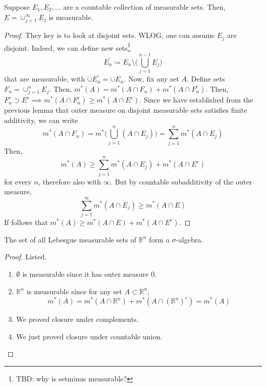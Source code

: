   \begin{theorem}
    Suppose $E_1, E_2, \ldots$ are a countable collection of measurable sets. Then, $E = \cup_{j=1}^\infty E_j$ is measurable. 
  \end{theorem}
  \begin{proof}
    They key is to look at disjoint sets. WLOG, one can assume $E_j$ are disjoint. Indeed, we can define new sets\footnote{TBD: why is setminus measurable?}
    \begin{equation}
      E_n^\prime \coloneqq E_n \setminus \bigg( \bigcup_{j=1}^{n-1} E_j \bigg) 
    \end{equation}
    that are measurable, with $\cup E_n^\prime = \cup E_n$. Now, fix any set $A$. Define sets $F_n = \cup_{j=1}^n E_j$. Then, $m^\ast (A) = m^\ast (A \cap F_n) + m^\ast (A \cap F_n^c)$. Then, $F_n^c \supset E^c \implies m^\ast (A \cap F_n^c) \geq m^\ast (A \cap E^c)$. Since we have established from the previous lemma that outer measure on disjoint measurable sets satisfies finite additivity, we can write
    \begin{equation}
      m^\ast (A \cap F_n) = m^\ast \bigg( \bigcup_{j=1}^n (A \cap E_j) \bigg) = \sum_{j=1}^n m^\ast (A \cap E_j) 
    \end{equation}
    Then, 
    \begin{equation}
      m^\ast (A) \geq \sum_{j=1}^n m^\ast (A \cap E_j) + m^\ast (A \cap E^c) 
    \end{equation}
    for every $n$, therefore also with $\infty$. But by countable subadditivity of the outer measure, 
    \begin{equation}
      \sum_{j=1}^\infty m^\ast (A \cap E_j) \geq m^\ast (A \cap E)
    \end{equation}
    If follows that $m^\ast (A) \geq m^\ast (A \cap E) + m^\ast (A \cap E^c)$. 
  \end{proof}

  \begin{corollary}
    The set of all Lebesgue measurable sets of $\mathbb{R}^n$ form a $\sigma$-algebra. 
  \end{corollary}
  \begin{proof}
    Listed. 
    \begin{enumerate}
      \item $\emptyset$ is measurable since it has outer measure $0$. 
      \item $\mathbb{R}^n$ is measurable since for any set $A \subset \mathbb{R}^n$, 
      \begin{equation}
        m^\ast (A) = m^\ast(A \cap \mathbb{R}^n) + m^\ast(A \cap (\mathbb{R}^n)^c) = m^\ast(A) 
      \end{equation}
      \item We proved closure under complements. 
      \item We just proved closure under countable union. 
    \end{enumerate}
  \end{proof}

